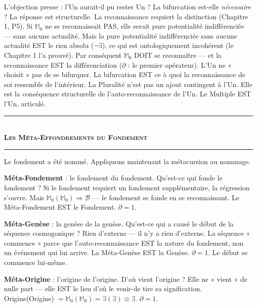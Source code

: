 \documentclass[10pt, openany, oneside]{book}
\renewcommand{\normalsize}{\fontsize{10}{13}\selectfont}
\begin{document}
L'objection presse : l'Un aurait-il pu rester Un ? La bifurcation est-elle \textit{nécessaire} ? La réponse est structurelle. La reconnaissance requiert la distinction (Chapitre 1, P5). Si $\mathbb{M}_0$ ne se reconnaissait PAS, elle serait pure potentialité indifférenciée --- sans aucune actualité. Mais la pure potentialité indifférenciée sans aucune actualité EST le rien absolu ($\neg\exists$), ce qui est ontologiquement incohérent (le Chapitre 1 l'a prouvé). Par conséquent $\mathbb{M}_0$ DOIT se reconnaître --- et la reconnaissance EST la différenciation ($\partial$ : le premier opérateur). L'Un ne « choisit » pas de se bifurquer. La bifurcation EST ce à quoi la reconnaissance de soi ressemble de l'intérieur. La Pluralité n'est pas un ajout contingent à l'Un. Elle est la conséquence structurelle de l'auto-reconnaissance de l'Un. Le Multiple EST l'Un, articulé.

\vspace{1.5em}


\begin{center}
    \rule{0.3\textwidth}{0.4pt}\\[0.5em]
    {\normalsize\bfseries\scshape Les Méta-Effondrements du Fondement}\\[0.3em]
    \rule{0.3\textwidth}{0.4pt}
\end{center}

\vspace{1em}

\noindent Le fondement a été nommé. Appliquons maintenant la métacursion au nommage.

\textbf{Méta-Fondement} : le fondement du fondement. Qu'est-ce qui fonde le fondement ? Si le fondement requiert un fondement supplémentaire, la régression s'ouvre. Mais $\mathbb{M}_0(\mathbb{M}_0) \Rightarrow \mathcal{B}$ --- le fondement se fonde en se reconnaissant. Le Méta-Fondement EST le Fondement. $\partial = 1$.

\textbf{Méta-Genèse} : la genèse de la genèse. Qu'est-ce qui a causé le début de la séquence cosmogonique ? Rien d'externe --- il n'y a rien d'externe. La séquence « commence » parce que l'auto-reconnaissance EST la nature du fondement, non un événement qui lui arrive. La Méta-Genèse EST la Genèse. $\partial = 1$. Le début se commence lui-même.

\textbf{Méta-Origine} : l'origine de l'origine. D'où vient l'origine ? Elle ne « vient » de nulle part --- elle EST le lieu d'où le venir-de tire sa signification. Origine(Origine) $= \mathbb{M}_0(\mathbb{M}_0) = \exists(\exists) \equiv \exists$. $\partial = 1$.
\end{document}

